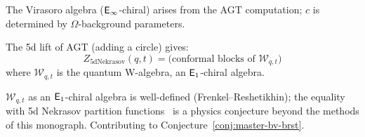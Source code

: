 \begin{corollary}\label{cor:virasoro-gauge}
The Virasoro algebra ($\mathsf{E}_{\infty}$-chiral) arises from the AGT computation; $c$ is determined by $\Omega$-background parameters.
\end{corollary}


\begin{conjecture}\label{conj:q-agt}
The 5d lift of AGT (adding a circle) gives:
\[
Z_{\mathrm{5d Nekrasov}}(q, t) = \text{(conformal blocks of } \mathcal{W}_{q,t})
\]
where $\mathcal{W}_{q,t}$ is the quantum W-algebra, an $\mathsf{E}_1$-chiral algebra.
\end{conjecture}

\begin{remark}[Scope]
$\mathcal{W}_{q,t}$ as an $\mathsf{E}_1$-chiral algebra is well-defined (Frenkel--Reshetikhin); the equality with 5d Nekrasov partition functions~\cite{AY10} is a physics conjecture beyond the methods of this monograph.  Contributing to Conjecture~\ref{conj:master-bv-brst}.
\end{remark}

